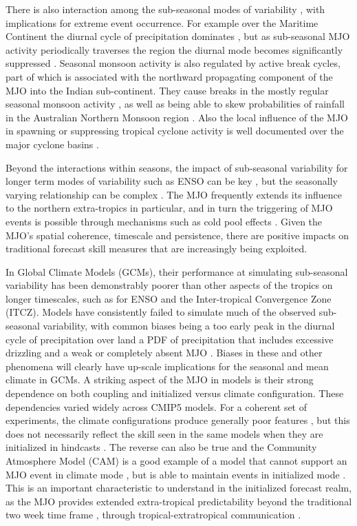 \documentclass[draft,ms]{AGUTeX}
\begin{document}
\begin{article}
There is also interaction among the sub-seasonal modes of variability \citep{Slingo2003}, with implications for extreme event occurrence. For example over the Maritime Continent the diurnal cycle of precipitation dominates \citep{Yang2001}, but as sub-seasonal MJO activity periodically traverses the region the diurnal mode becomes significantly suppressed \citep{Rauniyar2011}. Seasonal monsoon activity is also regulated by active break cycles, part of which is associated with the northward propagating component of the MJO into the Indian sub-continent. They cause breaks in the mostly regular seasonal monsoon activity \citep{Sperber2000,Annamalai2001}, as well as being able to skew probabilities of rainfall in the Australian Northern Monsoon region \citep{Wheeler2009}. Also the local influence of the MJO in spawning or suppressing tropical cyclone activity is well documented over the major cyclone basins \citep{Liebmann1994}. 

Beyond the interactions within seasons, the impact of sub-seasonal variability for longer term modes of variability such as ENSO can be key \citep{Tang2008}, but the seasonally varying relationship can be complex \citep{Hendon2007}. The MJO frequently extends its influence to the northern extra-tropics in particular, and in turn the triggering of MJO events is possible through mechanisms such as cold pool effects \citep{Wang2012a}. Given the MJO's spatial coherence, timescale and persistence, there are positive impacts on traditional forecast skill measures \citep{Jones2004} that are increasingly being exploited.

In Global Climate Models (GCMs), their performance at simulating sub-seasonal variability has been demonstrably poorer than other aspects of the tropics on longer timescales, such as for ENSO and the Inter-tropical Convergence Zone (ITCZ). Models have consistently failed to simulate much of the observed sub-seasonal variability, with common biases being a too early peak in the diurnal cycle of precipitation over land \citep{Dirmeyer2012} a PDF of precipitation that includes excessive drizzling \citep{Stephens2010} and a weak or completely absent MJO \citep{Lin2006}. Biases in these and other phenomena will clearly have up-scale implications for the seasonal and mean climate in GCMs. A striking aspect of the MJO in models is their strong dependence on both coupling and initialized versus climate configuration. These dependencies varied widely across CMIP5 models. For a coherent set of experiments, the climate configurations produce generally poor features \citep{Jiang2015}, but this does not necessarily reflect the skill seen in the same models when they are initialized in hindcasts \citep{Xavier2015}. The reverse can also be true and the Community Atmosphere Model (CAM) is a good example of a model that cannot support an MJO event in climate mode \citep{Neale2013}, but is able to maintain events in initialized mode \citep{Xie2012}. This is an important characteristic to understand in the initialized forecast realm, as the MJO provides extended extra-tropical predictability beyond the traditional two week time frame \citep{Jones2011}, through tropical-extratropical communication \citep{Garfinkel2014}.


\end{article}
\end{document}
